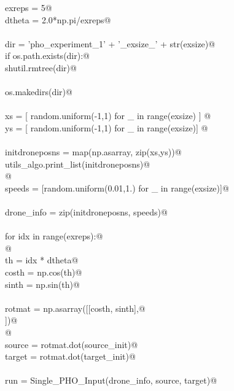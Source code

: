\documentclass[10.0pt]{report}
\begin{document}
\begin{flushleft}
\begin{minipage}{\linewidth}
\begin{list}{}{}
\mbox{}\verb@    exreps = 5@\\
\mbox{}\verb@    dtheta = 2.0*np.pi/exreps@\\
\mbox{}\verb@@\\
\mbox{}\verb@    dir = 'pho_experiment_1' + '_exsize_' + str(exsize)@\\
\mbox{}\verb@    if os.path.exists(dir):@\\
\mbox{}\verb@       shutil.rmtree(dir)@\\
\mbox{}\verb@@\\
\mbox{}\verb@    os.makedirs(dir)@\\
\mbox{}\verb@@\\
\mbox{}\verb@    xs     = [ random.uniform(-1,1) for _ in range(exsize) ] @\\
\mbox{}\verb@    ys     = [ random.uniform(-1,1) for _ in range(exsize)] @\\
\mbox{}\verb@@\\
\mbox{}\verb@    initdroneposns = map(np.asarray, zip(xs,ys))@\\
\mbox{}\verb@    utils_algo.print_list(initdroneposns)@\\
\mbox{}\verb@    @\\
\mbox{}\verb@    speeds = [random.uniform(0.01,1.) for _ in range(exsize)]@\\
\mbox{}\verb@@\\
\mbox{}\verb@    drone_info = zip(initdroneposns, speeds)@\\
\mbox{}\verb@@\\
\mbox{}\verb@    for idx in range(exreps):@\\
\mbox{}\verb@        @\\
\mbox{}\verb@         th    = idx * dtheta@\\
\mbox{}\verb@         costh = np.cos(th)@\\
\mbox{}\verb@         sinth = np.sin(th)@\\
\mbox{}\verb@@\\
\mbox{}\verb@         rotmat = np.asarray([[costh, sinth],@\\
\mbox{}])@\\
\mbox{}\verb@   @\\
\mbox{}\verb@         source = rotmat.dot(source_init)@\\
\mbox{}\verb@         target = rotmat.dot(target_init)@\\
\mbox{}\verb@@\\
\mbox{}\verb@         run = Single_PHO_Input(drone_info, source, target)@\\

\end{list}
\end{minipage}
\end{flushleft}
\end{document}
